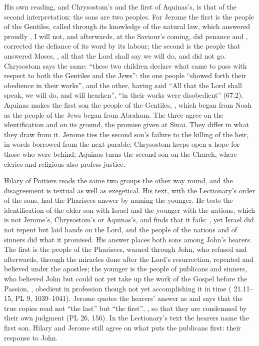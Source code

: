 His own reading, and Chrysostom's and the first of Aquinas's, is that of the
second interpretation: the sons are two peoples. For Jerome the first is the
people of the Gentiles, called through its knowledge of the natural law, which
answered proudly , I will not, and afterwards, at the Saviour's coming, did
penance and , corrected the
defiance of its word by its labour; the second is the people that answered
Moses, , all that the Lord
shall say we will do, and did not go.
Chrysostom says the same: ``these two children declare what came to pass with
respect to both the Gentiles and the Jews'': the one people ``showed forth
their obedience in their works'', and the other, having said ``All that the
Lord shall speak, we will do, and will hearken'', ``in their works were
disobedient'' (67.2). Aquinas makes the first son the people of the Gentiles, , which began from Noah as the
people of the Jews began from Abraham. The three agree on the
identification and on its ground, the promise given at Sinai. They differ in
what they draw from it. Jerome ties the second son's failure to the killing of
the heir, in words borrowed from the next parable; Chrysostom keeps open a
hope for those who were behind; Aquinas turns the second son on the Church,
where clerics and religious also profess justice.

Hilary of Poitiers reads the same two groups the other way round, and the
disagreement is textual as well as exegetical. His text, with the Lectionary's
order of the sons, had the Pharisees answer by naming the younger. He tests the
identification of the elder son with Israel and the younger with the nations,
which is not Jerome's, Chrysostom's or Aquinas's, and finds that it fails:
, yet Israel
did not repent but laid hands on the Lord, and the
people of the nations and of sinners did what it promised. His answer places
both sons among John's hearers. The first is the people of the Pharisees,
warned through John, who refused and afterwards, through the miracles done
after the Lord's resurrection, repented and believed under the apostles; the
younger is the people of publicans and sinners, who believed John but could
not yet take up the work of the Gospel before the Passion, , obedient in profession though not
yet accomplishing it in time ( 21.11--15, PL 9,
1039--1041). Jerome quotes the hearers' answer as  and says
that the true copies read not ``the last'' but ``the first'', , so that they are condemned by their own
judgment (PL 26, 156). In the Lectionary's text the hearers name the first
son. Hilary and Jerome still agree on what puts the publicans first: their response to John.

